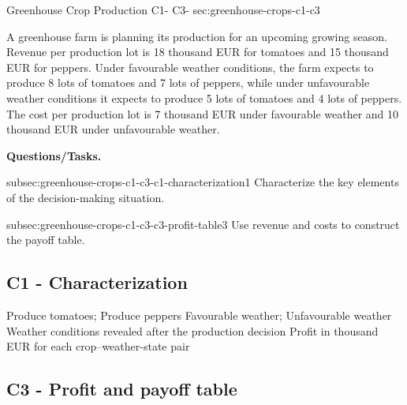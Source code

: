 	
	\sectionScored
	{Greenhouse Crop Production}
	{C1- \hspace{2mm} C3-}
	{sec:greenhouse-crops-c1-c3}
	{
		A greenhouse farm is planning its production for an upcoming growing
		season. Revenue per production lot is 18 thousand EUR for tomatoes and
		15 thousand EUR for peppers. Under favourable weather conditions, the
		farm expects to produce 8 lots of tomatoes and 7 lots of peppers, while
		under unfavourable weather conditions it expects to produce 5 lots of
		tomatoes and 4 lots of peppers. The cost per production lot is 7 thousand
		EUR under favourable weather and 10 thousand EUR under unfavourable
		weather.
		
		\textbf{Questions/Tasks.}
		\begin{enumerate}
			\CriterionTask
			{subsec:greenhouse-crops-c1-c3-c1-characterization}{1}
			{Characterize the key elements of the decision-making situation. }
			
			\CriterionTask
			{subsec:greenhouse-crops-c1-c3-c3-profit-table}{3}
			{Use revenue and costs to construct the payoff table. }
		\end{enumerate}
		
		\label{subsec:greenhouse-crops-c1-c3-c1-characterization}
		\subsection*{C1 - Characterization }
		
		\DecisionElementsTable
		{Produce tomatoes; Produce peppers}
		{Favourable weather; Unfavourable weather}
		{Weather conditions revealed after the production decision}
		{Profit in thousand EUR for each crop--weather-state pair}
		
		\label{subsec:greenhouse-crops-c1-c3-c3-profit-table}
		\subsection*{C3 - Profit and payoff table }
		
		
}
